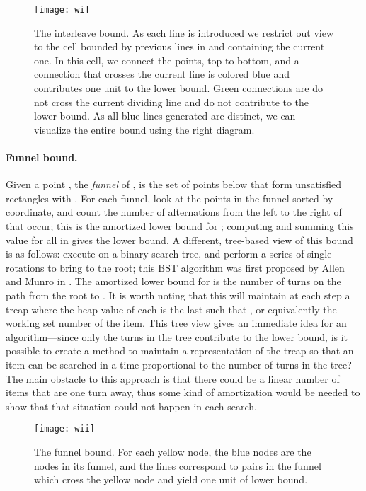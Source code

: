 \documentclass[11pt]{article}
\begin{document}
\begin{figure}
\begin{center}
\texttt{[image: wi]}
\end{center}
\caption{The interleave bound. As each line is introduced we restrict out view to the cell bounded by previous lines in and containing the current one. In this cell, we connect the points, top to bottom, and a connection that crosses the current line is colored blue and contributes one unit to the lower bound. Green connections are do not cross the current dividing line and do not contribute to the lower bound. As all blue lines generated are distinct, we can visualize the entire bound using the right diagram.}
\label{fig:wi}
\end{figure}

\paragraph{Funnel bound.}
Given a point , the \emph{funnel} of ,  is the set of points below  that form unsatisfied rectangles with . For each funnel, look at the points in the funnel sorted by  coordinate, and count the number of alternations from the left to the right of  that occur; this is the amortized lower bound for ; computing and summing this value for all  in  gives the lower bound. A different, tree-based view of this bound is as follows: execute  on a binary search tree, and perform a series of single rotations to bring  to the root; this BST algorithm was first proposed by Allen and Munro in \cite{DBLP:journals/jacm/AllenM78}. The amortized lower bound for  is the number of turns on the path from the root to . It is worth noting that this will maintain at each step a treap where the heap value of each  is the last  such that , or equivalently the working set number of the item. This tree view gives an immediate idea for an algorithm---since only the turns in the tree contribute to the lower bound, is it possible to create a method to maintain a representation of the treap so that an item can be searched in a time proportional to the number of turns in the tree? The main obstacle to this approach is that there could be a linear number of items that are one turn away, thus some kind of amortization would be needed to show that that situation could not happen in each search.


\begin{figure}
\begin{center}
\texttt{[image: wii]}
\end{center}
\caption{The funnel bound. For each yellow node, the blue nodes are the nodes in its funnel, and the lines correspond to pairs in the funnel which cross the yellow node and yield one unit of lower bound. }
\label{fig:wii}
\end{figure}
\end{document}
